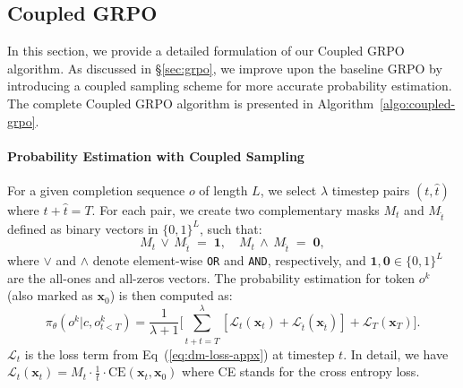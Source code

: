 \subsection{Coupled GRPO}
\label{appx:coupled-grpo}

In this section, we provide a detailed formulation of our Coupled GRPO algorithm. As discussed in \S\ref{sec:grpo}, we improve upon the baseline GRPO by introducing a coupled sampling scheme for more accurate probability estimation. The complete Coupled GRPO algorithm is presented in Algorithm~\ref{algo:coupled-grpo}.

\paragraph{Probability Estimation with Coupled Sampling}
For a given completion sequence $o$ of length $L$, we select $\lambda$ timestep pairs $(t, \hat{t})$ where $t + \hat{t} = T$. For each pair, we create two complementary masks $M_{t}$ and $M_{\hat{t}}$ defined as binary vectors in $\{0,1\}^{L}$, such that:
\begin{equation}
    \label{eq:complementary-masks}
    M_{t}\,\lor\,M_{\hat{t}}\;=\;\mathbf{1}, 
    \quad 
    M_{t}\,\land\,M_{\hat{t}}\;=\;\mathbf{0},
\end{equation}
where $\lor$ and $\land$ denote element-wise \texttt{OR} and \texttt{AND}, respectively, and $\mathbf{1}, \mathbf{0}\in\{0,1\}^{L}$ are the all-ones and all-zeros vectors.
The probability estimation for token $o^k$ (also marked as $\bm{x}_0$) is then computed as:
\begin{equation}
    \label{eq:coupled-prob}
    \pi_\theta(o^k| c,o_{t<T}^k) = \frac{1}{\lambda+1}\bigg[\sum_{t+\hat{t}=T}^{\lambda}[\mathcal{L}_{t}(\bm{x}_t) + \mathcal{L}_{\hat{t}}(\bm{x}_{\hat{t}})] + \mathcal{L}_{T}(\bm{x}_T)\bigg].
\end{equation}
$\mathcal{L}_{t}$ is the loss term from Eq~(\ref{eq:dm-loss-appx}) at timestep $t$. In detail, we have $\mathcal{L}_{t}(\bm{x}_t)=M_t\cdot \frac{1}{t}\cdot\text{CE}(\bm{x}_{t},\bm{x}_0)$ where CE stands for the cross entropy loss.

